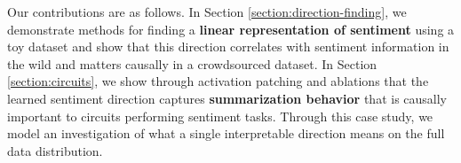 \documentclass{article} %
\begin{document}

Our contributions are as follows. In Section \ref{section:direction-finding}, we demonstrate methods for finding a \textbf{linear representation of sentiment} using a toy dataset and show that this direction correlates with sentiment information in the wild and matters causally in a crowdsourced dataset. In Section \ref{section:circuits}, we show through \gls{activation patching} \citep{vig2020causal, geiger-etal-2020-neural} and ablations that the learned sentiment direction captures \textbf{summarization behavior} that is causally important to circuits performing sentiment tasks. Through this case study, we model an investigation of what a single interpretable direction means on the full data distribution.
\end{document}
